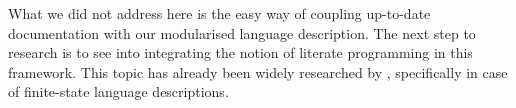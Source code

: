 \documentclass[postprint]{flammie}
\begin{document}
What we did not address here is the easy way of coupling up-to-date
documentation with our modularised language description. The next step to
research is to see into integrating the notion of literate programming in this
framework. This topic has already been widely researched by
\cite{maxwell/2008}, specifically in case of finite-state language
descriptions.





\end{document}

